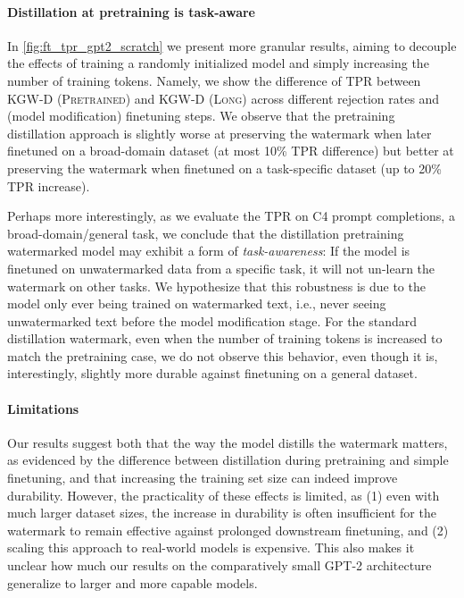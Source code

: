 

\paragraph{Distillation at pretraining is task-aware}
In \cref{fig:ft_tpr_gpt2_scratch} we present more granular results,
aiming to decouple the effects of training a randomly initialized model and simply increasing the number of training tokens.
Namely, we show the difference of TPR between \textsc{KGW-D (Pretrained)} and \textsc{KGW-D (Long)} across different rejection rates and (model modification) finetuning steps.
We observe that the pretraining distillation approach is slightly worse at preserving the watermark when later finetuned on a broad-domain dataset (at most 10\% TPR difference) but better at preserving the watermark when finetuned on a task-specific dataset (up to 20\% TPR increase).

Perhaps more interestingly, as we evaluate the TPR on C4 prompt completions, \ie a broad-domain/general task, we conclude that the distillation pretraining watermarked model may exhibit a form of \emph{task-awareness}: If the model is finetuned on unwatermarked data from a specific task, it will not un-learn the watermark on other tasks.
We hypothesize that this robustness is due to the model only ever being trained on watermarked text, i.e., never seeing unwatermarked text before the model modification stage.
For the standard distillation watermark, even when the number of training tokens is increased to match the pretraining case, we do not observe this behavior, even though it is, interestingly, slightly more durable against finetuning on a general dataset.

\paragraph{Limitations}
Our results suggest both that the way the model distills the watermark matters, as evidenced by the difference between distillation during pretraining and simple finetuning, and that increasing the training set size can indeed improve durability.  
However, the practicality of these effects is limited, as (1) even with much larger dataset sizes, the increase in durability is often insufficient for the watermark to remain effective against prolonged downstream finetuning, and (2) scaling this approach to real-world models is expensive.  
This also makes it unclear how much our results on the comparatively small \textsc{GPT-2} architecture generalize to larger and more capable models.  
